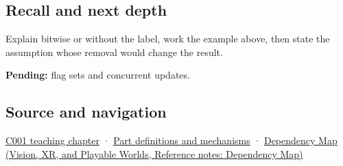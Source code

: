 \subsection{Recall and next depth}\label{appendix-a427ce8ce8a6-recall-and-next-depth}

Explain bitwise or without the label, work the example above, then state the assumption whose removal would change the result.

\textbf{Pending:} flag sets and concurrent updates.

\subsection{Source and navigation}\label{appendix-a427ce8ce8a6-source-and-navigation}

\hyperref[01-foundations-i-ch001-from-a-signal-to-an-interpretation]{C001 teaching chapter} · \hyperref[appendix-fd090d982a15]{Part definitions and mechanisms} · \href{../07-Vision-XR-and-Playable-Worlds/main.pdf\#nameddest=appendix-4ad47bdd269a}{Dependency Map (Vision, XR, and Playable Worlds, Reference notes: Dependency Map)}
